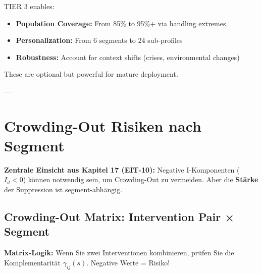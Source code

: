 TIER 3 enables:
\begin{itemize}[nosep]
\item \textbf{Population Coverage:} From 85\% to 95\%+ via handling extremes
\item \textbf{Personalization:} From 6 segments to 24 sub-profiles
\item \textbf{Robustness:} Account for context shifts (crises, environmental changes)
\end{itemize}

These are optional but powerful for mature deployment.

---

\section{Crowding-Out Risiken nach Segment}
\label{sec:19-crowding-out}

\textbf{Zentrale Einsicht aus Kapitel 17 (EIT-10):} Negative I-Komponenten ($I_d < 0$) können notwendig sein, um Crowding-Out zu vermeiden. Aber die \textbf{Stärke} der Suppression ist segment-abhängig.

\subsection{Crowding-Out Matrix: Intervention Pair × Segment}

\textbf{Matrix-Logik:} Wenn Sie zwei Interventionen kombinieren, prüfen Sie die Komplementarität $\gamma_{ij}(s)$. Negative Werte = Risiko!

